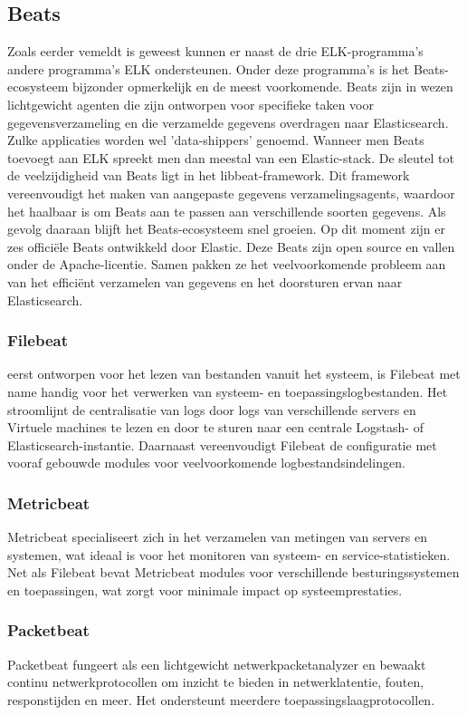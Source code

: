 \subsection{Beats}
Zoals eerder vemeldt is geweest kunnen er naast de drie ELK-programma's andere programma's ELK ondersteunen. Onder deze programma's is het Beats-ecosysteem bijzonder opmerkelijk en de meest voorkomende. Beats zijn in wezen lichtgewicht agenten die zijn ontworpen voor specifieke taken voor gegevensverzameling en die verzamelde gegevens overdragen naar Elasticsearch. Zulke applicaties worden wel 'data-shippers' genoemd. Wanneer men Beats toevoegt aan ELK spreekt men dan meestal van een Elastic-stack. De sleutel tot de veelzijdigheid van Beats ligt in het libbeat-framework. Dit framework vereenvoudigt het maken van aangepaste gegevens verzamelingsagents, waardoor het haalbaar is om Beats aan te passen aan verschillende soorten gegevens. Als gevolg daaraan blijft het Beats-ecosysteem snel groeien. Op dit moment zijn er zes officiële Beats ontwikkeld door Elastic. Deze Beats zijn open source en vallen onder de Apache-licentie. Samen pakken ze het veelvoorkomende probleem aan van het efficiënt verzamelen van gegevens en het doorsturen ervan naar Elasticsearch.~\autocite{objectrocket}  

\subsubsection{Filebeat}
eerst ontworpen voor het lezen van bestanden vanuit het systeem, is Filebeat met name handig voor het verwerken van systeem- en toepassingslogbestanden. Het stroomlijnt de centralisatie van logs door logs van verschillende servers en Virtuele machines te lezen en door te sturen naar een centrale Logstash- of Elasticsearch-instantie. Daarnaast vereenvoudigt Filebeat de configuratie met vooraf gebouwde modules voor veelvoorkomende logbestandsindelingen.

\subsubsection{Metricbeat}
Metricbeat specialiseert zich in het verzamelen van metingen van servers en systemen, wat ideaal is voor het monitoren van systeem- en service-statistieken. Net als Filebeat bevat Metricbeat modules voor verschillende besturingssystemen en toepassingen, wat zorgt voor minimale impact op systeemprestaties.

\subsubsection{Packetbeat}
Packetbeat fungeert als een lichtgewicht netwerkpacketanalyzer en bewaakt continu netwerkprotocollen om inzicht te bieden in netwerklatentie, fouten, responstijden en meer. Het ondersteunt meerdere toepassingslaagprotocollen.

